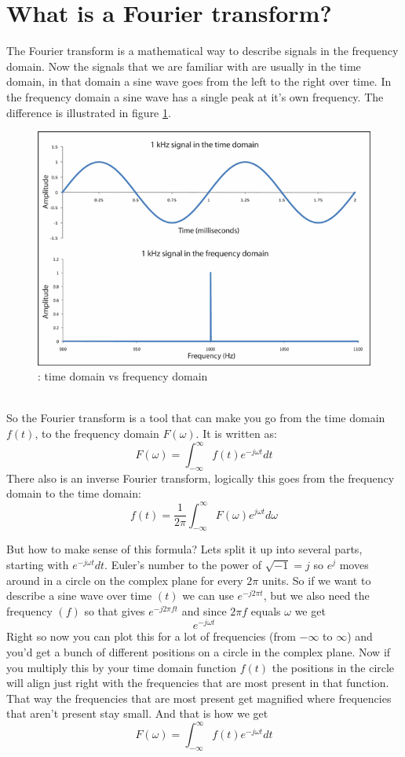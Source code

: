 \documentclass[11pt, A4, oneside]{article}
\begin{document}
\section{What is a Fourier transform?}

The Fourier transform is a mathematical way to describe signals in the frequency domain. Now the signals that we are familiar with are usually in the time domain, in that domain a sine wave goes from the left to the right over time. In the frequency domain a sine wave has a single peak at it's own frequency. The difference is illustrated in figure \ref{time_vs_freq}.\\
\begin{figure}[!ht]
	\centering
	\includegraphics[width=\linewidth]{time_and_frequency_domain}
	\caption{: time domain vs frequency domain}
	\label{time_vs_freq}
\end{figure}
\\
So the Fourier transform is a tool that can make you go from the time domain \(f(t)\), to the frequency domain \(F(\omega)\). It is written as: \[F(\omega) = \int_{-\infty}^{\infty} f(t)e^{-j\omega t} dt \] There also is an inverse Fourier transform, logically this goes from the frequency domain to the time domain:\[f(t) = \frac{1}{2\pi} \int_{-\infty}^{\infty} F(\omega)e^{j\omega t} d\omega \] 

\newpage
But how to make sense of this formula? Lets split it up into several parts, starting with \(e^{-j\omega t} dt\). Euler's number to the power of  \(\sqrt{-1} = j\)  so \(e^j\) moves around in a circle on the complex plane for every \(2\pi\) units. So if we want to describe a sine wave over time \((t)\) we can use \(e^{-j2\pi t}\), but we also need the frequency \((f)\) so that gives \(e^{-j2\pi f t}\) and since \(2 \pi f\) equals \(\omega\) we get \[e^{-j\omega t} \] Right so now you can plot this for a lot of frequencies (from \(-\infty\) to \(\infty\)) and you'd get a bunch of different positions on a circle in the complex plane. Now if you multiply this by your time domain function \(f(t)\) the positions in the circle will align just right with the frequencies that are most present in that function. That way the frequencies that are most present get magnified where frequencies that aren't present stay small. And that is how we get \[F(\omega) = \int_{-\infty}^{\infty} f(t)e^{-j\omega t} dt \]  
\end{document}
